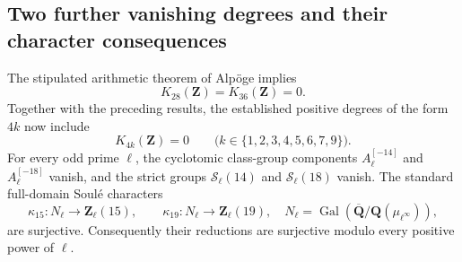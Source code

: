 \subsection{Two further vanishing degrees and their character consequences}
\label{sec:k28-k36-vanishing}

\begin{theorem}[K17-K28-K36]\label{thm:k28-k36-vanish}
The stipulated arithmetic theorem of Alp\"oge implies
\[
                         K_{28}(\mathbf Z)=K_{36}(\mathbf Z)=0.
 \tag{HK2.1}
\]
Together with the preceding results, the established positive degrees
of the form $4k$ now include
\[
             K_{4k}(\mathbf Z)=0
             \qquad\bigl(k\in\{1,2,3,4,5,6,7,9\}\bigr).
 \tag{HK2.2}
\]
For every odd prime $\ell$, the cyclotomic class-group components
$A_\ell^{[-14]}$ and $A_\ell^{[-18]}$ vanish, and the strict groups
$\mathcal S_\ell(14)$ and $\mathcal S_\ell(18)$ vanish.
The standard full-domain Soul\'e characters
\[
 \kappa_{15}:N_\ell\longrightarrow\mathbf Z_\ell(15),
 \qquad
 \kappa_{19}:N_\ell\longrightarrow\mathbf Z_\ell(19),
 \quad
 N_\ell=\operatorname{Gal}
  (\overline{\mathbf Q}/\mathbf Q(\mu_{\ell^\infty})),
\]
are surjective. Consequently their reductions are surjective modulo
every positive power of $\ell$.
\end{theorem}

